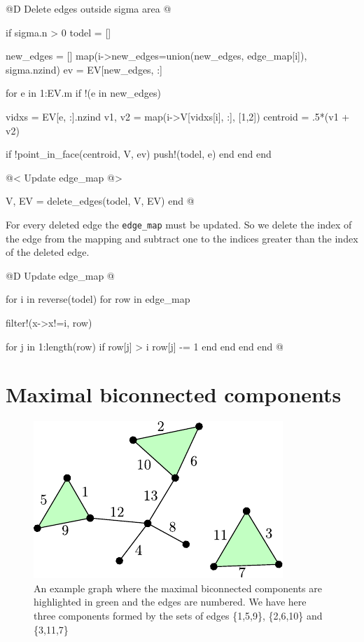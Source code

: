 @D Delete edges outside sigma area
@{if sigma.n > 0
    todel = []
    
    new_edges = []
    map(i->new_edges=union(new_edges, edge_map[i]), sigma.nzind)
    ev = EV[new_edges, :]

    for e in 1:EV.m
        if !(e in new_edges)

            vidxs = EV[e, :].nzind
            v1, v2 = map(i->V[vidxs[i], :], [1,2])
            centroid = .5*(v1 + v2)
            
            if !point_in_face(centroid, V, ev) 
                push!(todel, e)
            end
        end
    end

    @< Update edge\_map @>

    V, EV = delete_edges(todel, V, EV)
end
@}

\label{macro:update_edge_map}
For every deleted edge the \texttt{edge\_map} must be updated. 
So we delete the index of the edge from the mapping and subtract one 
to the indices greater than the index of the deleted edge.


@D Update edge\_map
@{for i in reverse(todel)
    for row in edge_map

        filter!(x->x!=i, row)

        for j in 1:length(row)
            if row[j] > i
                row[j] -= 1
            end
        end
    end
end
@}




\section{Maximal biconnected components}
\begin{figure}[h]
    \centering
    \includegraphics{./img/ch2-bicon.pdf}
    \caption{An example graph where the maximal biconnected 
    components are highlighted in green and the edges are numbered. 
    We have here three components formed by the sets of edges \{1,5,9\}, \{2,6,10\} and \{3,11,7\} }
    \label{img:bicon_comps}
\end{figure}
